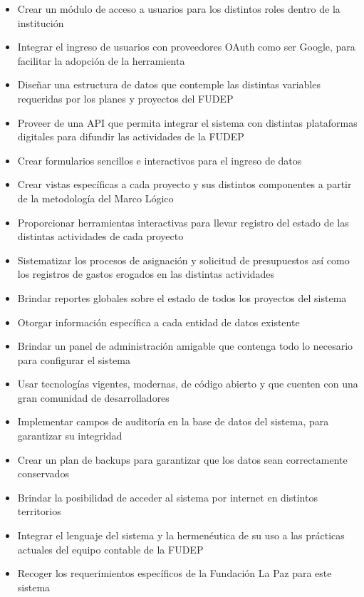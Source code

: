 \begin{itemize}
    \item Crear un módulo de acceso a usuarios para los distintos roles dentro de la institución
    \item Integrar el ingreso de usuarios con proveedores OAuth como ser Google, para facilitar la adopción de la herramienta
    \item Diseñar una estructura de datos que contemple las distintas variables requeridas por los planes y proyectos del FUDEP
    \item Proveer de una API que permita integrar el sistema con distintas plataformas digitales para difundir las actividades de la FUDEP
    \item Crear formularios sencillos e interactivos para el ingreso de datos
    \item Crear vistas específicas a cada proyecto y sus distintos componentes a partir de la metodología del Marco Lógico
    \item Proporcionar herramientas interactivas para llevar registro del estado de las distintas actividades de cada proyecto
    \item Sistematizar los procesos de asignación y solicitud de presupuestos así como los registros de gastos erogados en las distintas actividades
    \item Brindar reportes globales sobre el estado de todos los proyectos del sistema
    \item Otorgar información específica a cada entidad de datos existente
    \item Brindar un panel de administración amigable que contenga todo lo necesario para configurar el sistema
    \item Usar tecnologías vigentes, modernas, de código abierto y que cuenten con una gran comunidad de desarrolladores
    \item Implementar campos de auditoría en la base de datos del sistema, para garantizar su integridad
    \item Crear un plan de backups para garantizar que los datos sean correctamente conservados
    \item Brindar la posibilidad de acceder al sistema por internet en distintos territorios
    \item Integrar el lenguaje del sistema y la hermenéutica de su uso a las prácticas actuales del equipo contable de la FUDEP
    \item Recoger los requerimientos específicos de la Fundación La Paz para este sistema

\end{itemize}

